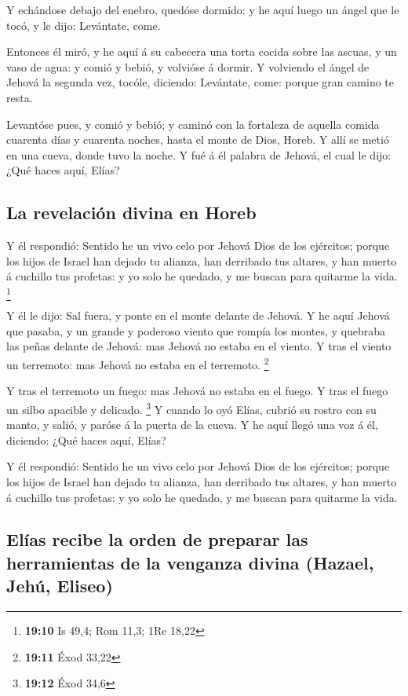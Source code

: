  Y echándose debajo del enebro, quedóse dormido: y he aquí
luego un ángel que le tocó, y le dijo: Levántate, come.

 Entonces él miró, y he aquí á su cabecera una torta cocida
sobre las ascuas, y un vaso de agua: y comió y bebió, y volvióse á
dormir.  Y volviendo el ángel de Jehová la segunda vez,
tocóle, diciendo: Levántate, come: porque gran camino te resta.

 Levantóse pues, y comió y bebió; y caminó con la fortaleza
de aquella comida cuarenta días y cuarenta noches, hasta el monte de
Dios, Horeb.  Y allí se metió en una cueva, donde tuvo la
noche. Y fué á él palabra de Jehová, el cual le dijo: ¿Qué haces aquí,
Elías?

\hypertarget{la-revelaciuxf3n-divina-en-horeb}{%
\subsection{La revelación divina en
Horeb}\label{la-revelaciuxf3n-divina-en-horeb}}

 Y él respondió: Sentido he un vivo celo por Jehová Dios de
los ejércitos; porque los hijos de Israel han dejado tu alianza, han
derribado tus altares, y han muerto á cuchillo tus profetas: y yo solo
he quedado, y me buscan para quitarme la vida. \footnote{\textbf{19:10}
  Is 49,4; Rom 11,3; 1Re 18,22}

 Y él le dijo: Sal fuera, y ponte en el monte delante de
Jehová. Y he aquí Jehová que pasaba, y un grande y poderoso viento que
rompía los montes, y quebraba las peñas delante de Jehová: mas Jehová no
estaba en el viento. Y tras el viento un terremoto: mas Jehová no estaba
en el terremoto. \footnote{\textbf{19:11} Éxod 33,22}

 Y tras el terremoto un fuego: mas Jehová no estaba en el
fuego. Y tras el fuego un silbo apacible y delicado. \footnote{\textbf{19:12}
  Éxod 34,6}  Y cuando lo oyó Elías, cubrió su rostro con
su manto, y salió, y paróse á la puerta de la cueva. Y he aquí llegó una
voz á él, diciendo: ¿Qué haces aquí, Elías?

 Y él respondió: Sentido he un vivo celo por Jehová Dios de
los ejércitos; porque los hijos de Israel han dejado tu alianza, han
derribado tus altares, y han muerto á cuchillo tus profetas: y yo solo
he quedado, y me buscan para quitarme la vida.

\hypertarget{eluxedas-recibe-la-orden-de-preparar-las-herramientas-de-la-venganza-divina-hazael-jehuxfa-eliseo}{%
\subsection{Elías recibe la orden de preparar las herramientas de la
venganza divina (Hazael, Jehú,
Eliseo)}\label{eluxedas-recibe-la-orden-de-preparar-las-herramientas-de-la-venganza-divina-hazael-jehuxfa-eliseo}}

